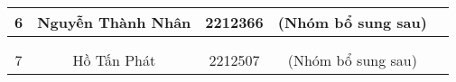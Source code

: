 \begin{table}[H]
\begin{tabular}{|c|c|c|c|l|}
\multirow{-3}{*}{6} & \multirow{-3}{*}{Nguyễn Thành Nhân}       & \multirow{-3}{*}{2212366}         & \multirow{-3}{*}{(Nhóm bổ sung sau)}                      &                                                                   \\ \hline
                    &                                           &                                   &                                                           &                                                                   \\ \cline{5-5} 
                    &                                           &                                   &                                                           &                                                                   \\ \cline{5-5}  
\multirow{-3}{*}{7} & \multirow{-3}{*}{Hồ Tấn Phát}             & \multirow{-3}{*}{2212507}         & \multirow{-3}{*}{(Nhóm bổ sung sau)}                      &                                                                   \\ \hline

\end{tabular}
\end{table}
\newpage